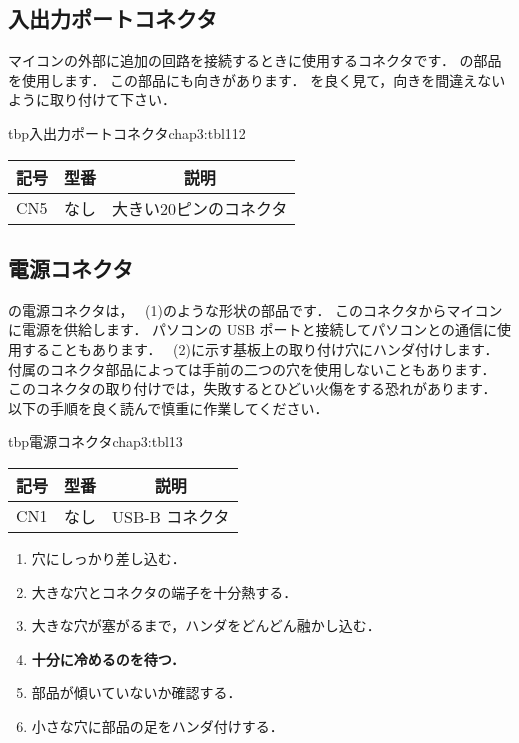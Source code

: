 \subsection{入出力ポートコネクタ}
マイコンの外部に追加の回路を接続するときに使用するコネクタです．
の部品を使用します．
この部品にも向きがあります．
を良く見て，向きを間違えないように取り付けて下さい．

\begin{mytable}{tbp}{入出力ポートコネクタ}{chap3:tbl112}
{\small\begin{tabular}{l|l|l}
\hline
\hline
\multicolumn{1}{c|}{記号} &
\multicolumn{1}{c|}{型番} &
\multicolumn{1}{c}{説明} \\
\hline
CN5 & なし & 大きい20ピンのコネクタ \\
\end{tabular}}
\end{mytable}


\subsection{電源コネクタ}

の電源コネクタは，
~(1)のような形状の部品です．
このコネクタからマイコンに電源を供給します．
パソコンの USB ポートと接続してパソコンとの通信に使用することもあります．
~(2)に示す基板上の取り付け穴にハンダ付けします．
付属のコネクタ部品によっては手前の二つの穴を使用しないこともあります．
このコネクタの取り付けでは，失敗するとひどい火傷をする恐れがあります．
以下の手順を良く読んで慎重に作業してください．

\begin{mytable}{tbp}{電源コネクタ}{chap3:tbl13}
{\small\begin{tabular}{l|l|l}
\hline
\hline
\multicolumn{1}{c|}{記号} &
\multicolumn{1}{c|}{型番} &
\multicolumn{1}{c}{説明} \\
\hline
CN1 & なし & USB-B コネクタ \\
\end{tabular}}
\end{mytable}


\begin{enumerate}
\item 穴にしっかり差し込む．
\item 大きな穴とコネクタの端子を十分熱する．
\item 大きな穴が塞がるまで，ハンダをどんどん融かし込む．
\item {\bf 十分に冷めるのを待つ．}
\item 部品が傾いていないか確認する．
\item 小さな穴に部品の足をハンダ付けする．
\end{enumerate}

